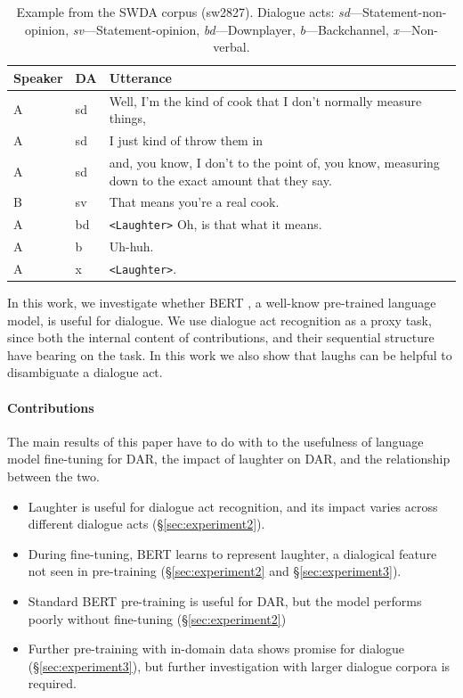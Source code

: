 \documentclass[11pt,a4paper]{article}
\begin{document}
\begin{table}
      \small
  \centering
  \begin{tabularx}{\linewidth}{llL}
    \toprule
    Speaker & DA & Utterance \\ \midrule
    A	&sd	& Well, I'm the kind of cook that I don't normally measure things,  \\
    A	&sd	& I just kind of throw them in \\
    A	&sd	& and, you know, I don't to the point of, you know, measuring down to the exact amount that they say.  \\
    B	&sv	& That means you're a real cook. \\
    A	&bd	& \texttt{<Laughter>} Oh, is that what it means.  \\
    A	&b	& Uh-huh.  \\
    A	&x	& \texttt{<Laughter>}.\\
             \bottomrule
  \end{tabularx}
  \caption{Example from the SWDA corpus (sw2827). Dialogue acts: \emph{sd}---Statement-non-opinion, \emph{sv}---Statement-opinion, \emph{bd}---Downplayer, \emph{b}---Backchannel, \emph{x}---Non-verbal. }
  \label{table:example}
\end{table}

In this work, we investigate whether BERT \citep{devlinBERTPretrainingDeep2018}, a well-know pre-trained language model, is useful for dialogue.
We use dialogue act recognition  as a proxy task, since both the internal content of contributions, and their sequential structure have bearing on the task.
In this work we also show that laughs can be helpful to disambiguate a dialogue act.

\paragraph{Contributions}
The main results of this paper have to do with to the usefulness of language model fine-tuning for DAR, the impact of laughter on DAR, and the relationship between the two.
\begin{itemize}
  \item Laughter is useful for dialogue act recognition, and its impact varies across different dialogue acts (\S\ref{sec:experiment2}).
  \item During fine-tuning, BERT learns to represent laughter, a dialogical feature not seen in pre-training (\S\ref{sec:experiment2} and \S\ref{sec:experiment3}).
  \item Standard BERT pre-training is useful for DAR, but the model performs poorly without fine-tuning (\S\ref{sec:experiment2})
  \item Further pre-training with in-domain data shows promise for dialogue (\S\ref{sec:experiment3}), but further investigation with larger dialogue corpora is required.
\end{itemize}
\end{document}
